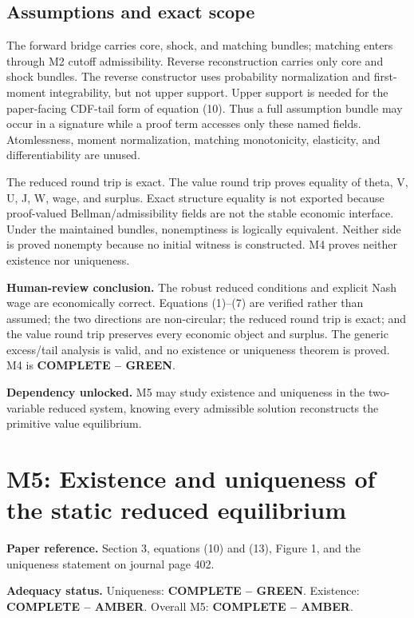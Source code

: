 \documentclass[11pt]{article}
\newcommand{\completeGreen}{\textcolor{green!50!black}{\textbf{COMPLETE -- GREEN}}}
\newcommand{\statusReview}[1]{\textcolor{amber}{\textbf{#1}}}
\begin{document}
\subsection{Assumptions and exact scope}

The forward bridge carries core, shock, and matching bundles; matching enters
through M2 cutoff admissibility. Reverse reconstruction carries only core and
shock bundles. The reverse constructor uses probability normalization and
first-moment integrability, but not upper support. Upper support is needed for
the paper-facing CDF-tail form of equation (10). Thus a full assumption bundle
may occur in a signature while a proof term accesses only these named fields.
Atomlessness, moment normalization, matching monotonicity, elasticity, and
differentiability are unused.

The reduced round trip is exact. The value round trip proves equality of
theta, V, U, J, W, wage, and surplus. Exact structure equality is not exported
because proof-valued Bellman/admissibility fields are not the stable economic
interface. Under the maintained bundles, nonemptiness is logically
equivalent. Neither side is proved nonempty because no initial witness is
constructed. M4 proves neither existence nor uniqueness.

\textbf{Human-review conclusion.} The robust reduced conditions and explicit
Nash wage are economically correct. Equations (1)--(7) are verified rather
than assumed; the two directions are non-circular; the reduced round trip is
exact; and the value round trip preserves every economic object and surplus.
The generic excess/tail analysis is valid, and no existence or uniqueness
theorem is proved. M4 is \completeGreen.

\textbf{Dependency unlocked.} M5 may study existence and uniqueness in the
two-variable reduced system, knowing every admissible solution reconstructs
the primitive value equilibrium.

\section{M5: Existence and uniqueness of the static reduced equilibrium}

\textbf{Paper reference.} Section 3, equations (10) and (13), Figure 1, and
the uniqueness statement on journal page 402.

\textbf{Adequacy status.} Uniqueness: \completeGreen. Existence:
\statusReview{COMPLETE -- AMBER}. Overall M5:
\statusReview{COMPLETE -- AMBER}.
\end{document}
